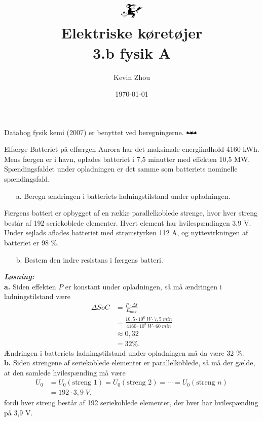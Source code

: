 \documentclass{report}
\title{
\[
\mathwitch*
\]
Elektriske køretøjer\\
{\Large \textbf{3.b fysik A}}}
\author{Kevin Zhou}
\date{\today}
\newcommand{\sol}{\setlength{\parindent}{0cm}\textbf{\textit{Løsning:}}\setlength{\parindent}{1cm}}
\begin{document}
\maketitle
\begin{note}
  Databog fysik kemi (2007) er benyttet ved beregningerne. $\mathbat$
\end{note}
\begin{question}{Elfærge}{}
  Batteriet på elfærgen Aurora har det maksimale energiindhold 4160 kWh.
Mens færgen er i havn, oplades batteriet i 7,5 minutter med effekten 10,5
MW.
Spændingsfaldet under opladningen er det samme som batteriets nominelle
spændingsfald.
\begin{itemize}
  \item[a.] Beregn ændringen i batteriets ladningstilstand under opladningen.
\end{itemize}
Færgens batteri er opbygget af en række parallelkoblede strenge, hvor hver
streng består af 192 seriekoblede elementer. Hvert element har
hvilespændingen 3,9 V.
Under sejlads aflades batteriet med strømstyrken 112 A, og nyttevirkningen
af batteriet er 98 \%.
\begin{itemize}
  \item[b.] Bestem den indre resistans i færgens batteri.
\end{itemize}
\end{question}
\sol \\
\textbf{a.}
Siden effekten $P$ er konstant under opladningen, så må ændringen i ladningstilstand være 
\begin{equation*}
\begin{split}
  \Delta SoC&=\frac{P \cdot \Delta t}{E _{\text{max} }}\\
  &=\frac{10,5 \cdot 10^6 \;\unit{W} \cdot 7,5 \;\unit{min} }{4160 \cdot 10^3 \;\unit{W} \cdot 60 \;\unit{min} }\\
  &\approx 0,32\\
  &=32 \%.
\end{split}
\end{equation*}
Ændringen i batteriets ladningstilstand under opladningen må da være 32 \%.\\[1ex]
\textbf{b.}
Siden strengene af seriekoblede elementer er parallelkoblede, så må der gælde, at den samlede hvilespænding må være
\begin{equation*}
\begin{split}
  U_0&=U_0(\text{streng 1}) = U_0(\text{streng 2}) = \cdots =U_0(\text{streng } n)\\
  &=192 \cdot 3,9 \;\unit{V},
\end{split}
\end{equation*}
fordi hver streng består af 192 seriekoblede elementer, der hver har hvilespænding på 3,9 V.
\end{document}
